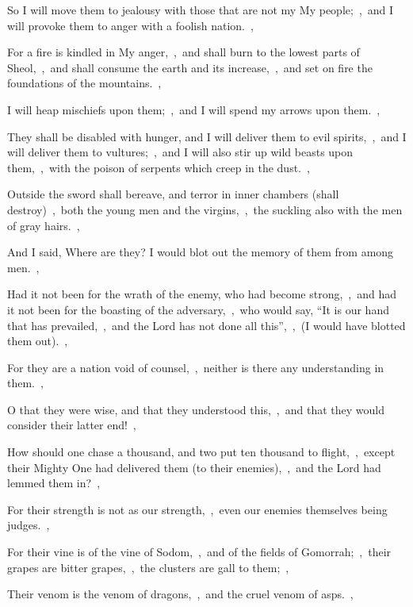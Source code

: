 \documentclass[12pt,twoside,a5paper]{article}
\begin{document}
\begin{halfparskip}
   So I will move them to jealousy with those that are not my My people;~\sep\ and I will provoke them to anger with a foolish nation.~\sep


  For a fire is kindled in My anger,~\sep\ and shall burn to the lowest parts of Sheol,~\sep\ and shall consume the earth and its increase,~\sep\ and set on fire the foundations of the mountains.~\sep

  I will heap mischiefs upon them;~\sep\ and I will spend my arrows upon them.~\sep

  They shall be disabled with hunger, and I will deliver them to evil spirits,~\sep\ and I will deliver them to vultures;~\sep\ and I will also stir up wild beasts upon them,~\sep\ with the poison of serpents which creep in the dust.~\sep

  Outside the sword shall bereave, and terror in inner chambers (shall destroy)~\sep\ both the young men and the virgins,~\sep\ the suckling also with the men of gray hairs.~\sep

  And I said, Where are they? I would blot out the memory of them from among men.~\sep

  Had it not been for the wrath of the enemy, who had become strong,~\sep\ and had it not been for the boasting of the adversary,~\sep\ who would say, ``It is our hand that has prevailed,~\sep\ and the Lord has not done all this'',~\sep\ (I would have blotted them out).~\sep

  For they are a nation void of counsel,~\sep\ neither is there any understanding in them.~\sep

  O that they were wise, and that they understood this,~\sep\ and that they would consider their latter end!~\sep

  How should one chase a thousand, and two put ten thousand to flight,~\sep\ except their Mighty One had delivered them (to their enemies),~\sep\ and the Lord had lemmed them in?~\sep

  For their strength is not as our strength,~\sep\ even our enemies themselves being judges.~\sep

  For their vine is of the vine of Sodom,~\sep\ and of the fields of Gomorrah;~\sep\ their grapes are bitter grapes,~\sep\ the clusters are gall to them;~\sep

  Their venom is the venom of dragons,~\sep\ and the cruel venom of asps.~\sep


\end{halfparskip}
\end{document}
